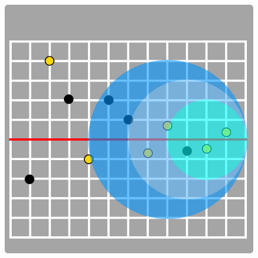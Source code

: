     \begin{figure}[h]
        \centering
        \includegraphics[scale=0.3]{Images/8.2.2.png}
    \end{figure}

    \newpage



